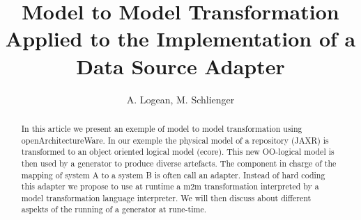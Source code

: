 \documentclass[a4paper,10pt]{article}
\title{Model to Model Transformation Applied to the Implementation of a Data Source Adapter}
\author{A. Logean, M. Schlienger}
\begin{document}
\maketitle

\begin{abstract}
In this article we present an exemple of model to model transformation using openArchitectureWare. In our exemple the physical model of a
repository (JAXR) is transformed to an object oriented logical model (ecore). This new OO-logical model is then used by a generator to
produce diverse artefacts. The component in charge of the mapping of system A to a system B is often call an adapter. Instead of hard coding
this adapter we propose to use at runtime a m2m transformation interpreted by a model transformation language interpreter. We will then
discuss about different aspekts of the running of a generator at rune-time.
\end{abstract}
\end{document}
